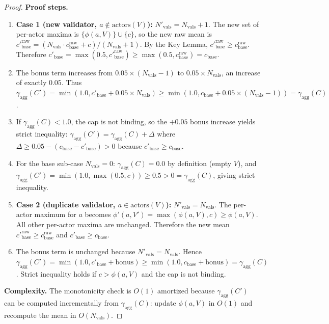 \begin{proof}
\textbf{Proof steps.}
\begin{enumerate}[label=Step~\arabic*:,leftmargin=2em]
    \item \textbf{Case 1 (new validator, $a \notin \text{actors}(V)$):} $N'_{\text{vals}} = N_{\text{vals}} + 1$. The new set of per-actor maxima is $\{\phi(a, V)\} \cup \{c\}$, so the new raw mean is $c'^{\text{raw}}_{\text{base}} = (N_{\text{vals}} \cdot c_{\text{base}}^{\text{raw}} + c) / (N_{\text{vals}} + 1)$. By the Key Lemma, $c'^{\text{raw}}_{\text{base}} \geq c_{\text{base}}^{\text{raw}}$. Therefore $c'_{\text{base}} = \max(0.5, c'^{\text{raw}}_{\text{base}}) \geq \max(0.5, c_{\text{base}}^{\text{raw}}) = c_{\text{base}}$.
    \item The bonus term increases from $0.05 \times (N_{\text{vals}} - 1)$ to $0.05 \times N_{\text{vals}}$, an increase of exactly $0.05$. Thus $\gamma_{\text{agg}}(C') = \min(1.0, c'_{\text{base}} + 0.05 \times N_{\text{vals}}) \geq \min(1.0, c_{\text{base}} + 0.05 \times (N_{\text{vals}} - 1)) = \gamma_{\text{agg}}(C)$.
    \item If $\gamma_{\text{agg}}(C) < 1.0$, the cap is not binding, so the $+0.05$ bonus increase yields strict inequality: $\gamma_{\text{agg}}(C') = \gamma_{\text{agg}}(C) + \Delta$ where $\Delta \geq 0.05 - (c_{\text{base}} - c'_{\text{base}}) > 0$ because $c'_{\text{base}} \geq c_{\text{base}}$.
    \item For the base sub-case $N_{\text{vals}} = 0$: $\gamma_{\text{agg}}(C) = 0.0$ by definition (empty $V$), and $\gamma_{\text{agg}}(C') = \min(1.0, \max(0.5, c)) \geq 0.5 > 0 = \gamma_{\text{agg}}(C)$, giving strict inequality.
    \item \textbf{Case 2 (duplicate validator, $a \in \text{actors}(V)$):} $N'_{\text{vals}} = N_{\text{vals}}$. The per-actor maximum for $a$ becomes $\phi'(a, V') = \max(\phi(a, V), c) \geq \phi(a, V)$. All other per-actor maxima are unchanged. Therefore the new mean $c'^{\text{raw}}_{\text{base}} \geq c_{\text{base}}^{\text{raw}}$ and $c'_{\text{base}} \geq c_{\text{base}}$.
    \item The bonus term is unchanged because $N'_{\text{vals}} = N_{\text{vals}}$. Hence $\gamma_{\text{agg}}(C') = \min(1.0, c'_{\text{base}} + \text{bonus}) \geq \min(1.0, c_{\text{base}} + \text{bonus}) = \gamma_{\text{agg}}(C)$. Strict inequality holds if $c > \phi(a, V)$ and the cap is not binding.
\end{enumerate}

\textbf{Complexity.} The monotonicity check is $O(1)$ amortized because $\gamma_{\text{agg}}(C')$ can be computed incrementally from $\gamma_{\text{agg}}(C)$: update $\phi(a, V)$ in $O(1)$ and recompute the mean in $O(N_{\text{vals}})$.
\end{proof}

